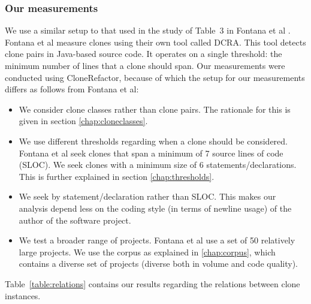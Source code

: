 \documentclass[a4paper]{article}
\begin{document}
\subsubsection{Our measurements}
We use a similar setup to that used in the study of Table~3 in Fontana et al \cite{fontana2015duplicated}. Fontana et al measure clones using their own tool called DCRA. This tool detects clone pairs in Java-based source code. It operates on a single threshold: the minimum number of lines that a clone should span. Our measurements were conducted using CloneRefactor, because of which the setup for our measurements differs as follows from Fontana et al:
\begin{itemize}
  \item We consider clone classes rather than clone pairs. The rationale for this is given in section \ref{chap:cloneclasses}.
\item We use different thresholds regarding when a clone should be considered. Fontana et al seek clones that span a minimum of 7 source lines of code (SLOC). We seek clones with a minimum size of 6 statements/declarations. This is further explained in section \ref{chap:thresholds}.
\item We seek by statement/declaration rather than SLOC. This makes our analysis depend less on the coding style (in terms of newline usage) of the author of the software project.
\item We test a broader range of projects. Fontana et al use a set of 50 relatively large projects. We use the corpus as explained in \ref{chap:corpus}, which contains a diverse set of projects (diverse both in volume and code quality).
\end{itemize}

Table~\ref{table:relations} contains our results regarding the relations between clone instances.
\end{document}
